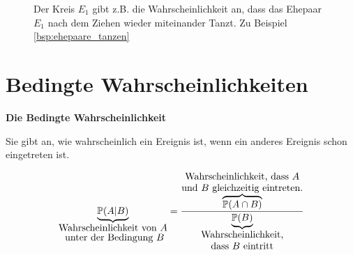 {    \begin{figure}
    \centering
    \label{fig:teilmengen}
    \caption{Der Kreis $E_1$ gibt z.B. die Wahrscheinlichkeit an, dass das Ehepaar $E_1$ nach dem Ziehen wieder miteinander Tanzt. Zu Beispiel \ref{bsp:ehepaare_tanzen}}
    \end{figure}



	\newpage
    \section{Bedingte Wahrscheinlichkeiten}

    \begin{definition}\textbf{Die Bedingte Wahrscheinlichkeit}
    \label{def:bedingte_wahrscheinlichkeit}

    Sie gibt an, wie wahrscheinlich ein Ereignis
    ist, wenn ein anderes Ereignis schon eingetreten ist.

    \[
        \underbrace{\mathbb{P}(A|B)}_{\shortstack{\text{Wahrscheinlichkeit von $A$}\\\text{ unter der Bedingung $B$}}}=
        \frac{\overbrace{\mathbb P(A\cap B)}^{\shortstack{\text{Wahrscheinlichkeit, dass $A$}\\\text{und $B$ gleichzeitig eintreten.}}}}
        {\underbrace{\mathbb{P}(B)}_{\shortstack{\text{Wahrscheinlichkeit,}\\\text{dass $B$ eintritt}}}}
    \]
    \end{definition}

}
